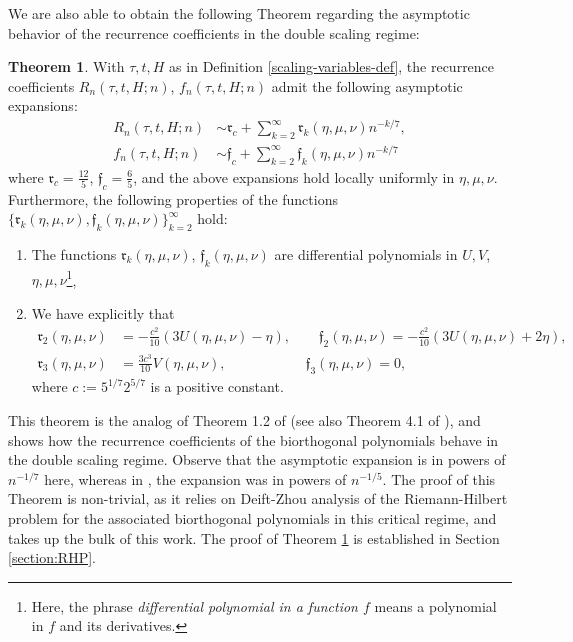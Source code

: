 \documentclass[usenames,dvipsnames]{article}
\theoremstyle{definition}
\newtheorem{theorem}{Theorem}[section]
\numberwithin{equation}{section}
\numberwithin{figure}{section}
\begin{document}
We are also able to obtain the following Theorem regarding the asymptotic behavior of the recurrence coefficients in the double scaling regime:

\begin{theorem}\label{propA}
    With $\tau,t,H$ as in Definition \ref{scaling-variables-def}, the recurrence coefficients $R_n(\tau,t,H;n)$, $f_n(\tau,t,H;n)$ admit the 
    following asymptotic expansions: 
        \begin{align}
            R_n(\tau,t,H;n) &\sim \mathfrak{r}_c + \sum_{k=2}^{\infty} \mathfrak{r}_k(\eta,\mu,\nu)n^{-k/7},\\
            f_n(\tau,t,H;n) &\sim \mathfrak{f}_c + \sum_{k=2}^{\infty} \mathfrak{f}_k(\eta,\mu,\nu)n^{-k/7}
        \end{align}
    where $\mathfrak{r}_c = \frac{12}{5}$, $\mathfrak{f}_c = \frac{6}{5}$, and the above expansions hold locally uniformly in $\eta,\mu,\nu$. Furthermore, the following properties of the functions 
    $\{\mathfrak{r}_k(\eta,\mu,\nu),\mathfrak{f}_k(\eta,\mu,\nu)\}_{k=2}^{\infty}$ hold:
        \begin{enumerate}
            \item The functions $\mathfrak{r}_k(\eta,\mu,\nu)$, $\mathfrak{f}_k(\eta,\mu,\nu)$ are differential polynomials in $U,V$, $\eta,\mu,\nu$\footnote{Here, the phrase \textit{differential polynomial in a function $f$} means a polynomial in $f$ and its derivatives.},
            \item We have explicitly that
                \begin{align}
                    \mathfrak{r}_{2}(\eta,\mu,\nu) &= -\frac{c^2}{10}\left(3U(\eta,\mu,\nu)-\eta\right),\qquad \mathfrak{f}_{2}(\eta,\mu,\nu) =  -\frac{c^2}{10}\left(3U(\eta,\mu,\nu)+2\eta\right),\\
                    \mathfrak{r}_{3}(\eta,\mu,\nu) &= \frac{3c^3}{10}V(\eta,\mu,\nu),\qquad\quad\,\,\,\,\qquad \mathfrak{f}_{3}(\eta,\mu,\nu) = 0,
                \end{align}
            where $c:=5^{1/7}2^{5/7}$ is a positive constant.
        \end{enumerate}
\end{theorem}
This theorem is the analog of Theorem 1.2 of \cite{DK0} (see also Theorem 4.1 of \cite{Bleher-Kuijlaars}), and shows how the recurrence coefficients of the biorthogonal polynomials behave in the double scaling regime. Observe that the asymptotic expansion is in powers of $n^{-1/7}$ here, whereas in \cite{DK0,Bleher-Kuijlaars}, the expansion was in powers of $n^{-1/5}$.
The proof of this Theorem is non-trivial, as it relies on Deift-Zhou analysis of the Riemann-Hilbert problem for the associated biorthogonal polynomials in this critical regime, and takes up the bulk of this work. The proof of Theorem \ref{propA} is established in Section \ref{section:RHP}.
\end{document}
